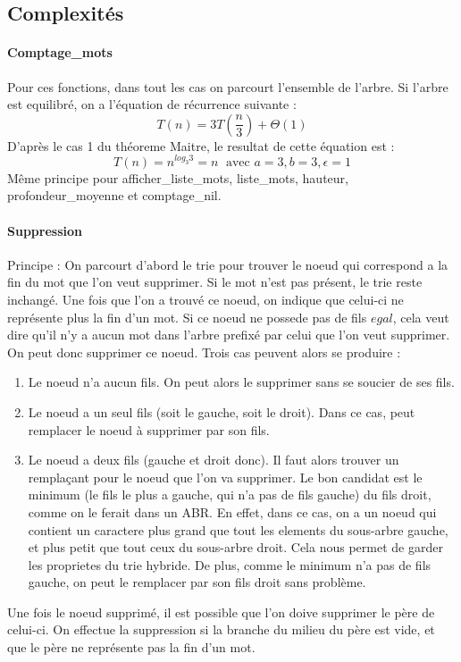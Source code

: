 \documentclass[11pt]{report} %
\begin{document}
\subsection{Complexités}
\paragraph{\textbf{Comptage\_mots}}
Pour ces fonctions, dans tout les cas on parcourt l'ensemble de l'arbre. Si l'arbre est equilibré, on a l'équation de récurrence suivante :
\[
T(n)=3T\left(\frac{n}{3}\right)+\Theta(1)
\] 
D'après le cas 1 du théoreme Maitre, le resultat de cette équation est : 
\[
T(n)=n^{log_{3}3}=n \; \text{ avec } a=3, b=3, \epsilon=1
\]
Même principe pour afficher\_liste\_mots, liste\_mots, hauteur, profondeur\_moyenne et comptage\_nil.

\paragraph{\textbf{Suppression}}
Principe : On parcourt d'abord le trie pour trouver le noeud qui correspond a la fin du mot que l'on veut supprimer.
Si le mot n'est pas présent, le trie reste inchangé. Une fois que l'on a trouvé ce noeud, on indique que celui-ci ne représente plus la fin d'un mot. Si ce noeud ne possede pas de fils $egal$, cela veut dire qu'il n'y a aucun mot dans l'arbre prefixé par celui que l'on veut supprimer. On peut donc supprimer ce noeud. Trois cas peuvent alors se produire : \\
\begin{enumerate}
\item Le noeud n'a aucun fils. On peut alors le supprimer sans se soucier de ses fils. 
\item Le noeud a un seul fils (soit le gauche, soit le droit). Dans ce cas, peut remplacer le noeud à supprimer par son fils.
\item Le noeud a deux fils (gauche et droit donc). Il faut alors trouver un remplaçant pour le noeud que l'on va supprimer. Le bon candidat est le minimum (le fils le plus a gauche, qui n'a pas de fils gauche) du fils droit, comme on le ferait dans un ABR. En effet, dans ce cas, on a un noeud qui contient un caractere plus grand que tout les elements du sous-arbre gauche, et plus petit que tout ceux du sous-arbre droit. Cela nous permet de garder les proprietes du trie hybride. De plus, comme le minimum n'a pas de fils gauche, on peut le remplacer par son fils droit sans problème.
\end{enumerate}
Une fois le noeud supprimé, il est possible que l'on doive supprimer le père de celui-ci. On effectue la suppression si la branche du milieu du père est vide, et que le père ne représente pas la fin d'un mot.
\end{document}
